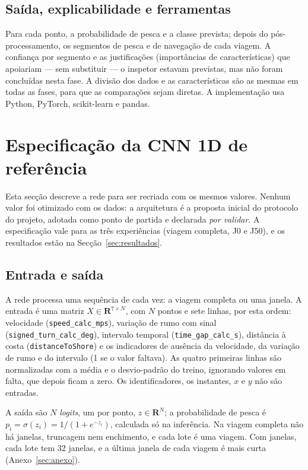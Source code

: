 \documentclass{article}
\newcommand{\revtext}[2]{{\color{#1}#2}}
\begin{document}
\subsection{\texorpdfstring{\revtext{rev023}{Saída, explicabilidade e ferramentas}}{Saída, explicabilidade e ferramentas}}
\label{sec:abordagem-saida}

\revtext{rev062}{Para cada ponto, a probabilidade de pesca e a classe prevista; depois do pós-processamento, os segmentos de pesca e de navegação de cada viagem. A confiança por segmento e as justificações (importâncias de características) que apoiariam --- sem substituir --- o inspetor estavam previstas, mas não foram concluídas nesta fase.} \revtext{rev021}{A divisão dos dados e as características são as mesmas em todas as fases, para que as comparações sejam diretas.} A implementação usa Python, PyTorch, scikit-learn e pandas.

\section{\texorpdfstring{Especificação da CNN 1D de referência}{Especificação da CNN 1D de referência}}
\label{sec:cnn-especificacao}

\revtext{rev052}{Esta secção descreve a rede para ser recriada com os mesmos valores. Nenhum valor foi otimizado com os dados: a arquitetura é a proposta inicial do protocolo do projeto, adotada como ponto de partida e declarada \emph{por validar}. A especificação vale para as três experiências (viagem completa, J0 e J50), e os resultados estão na Secção~\ref{sec:resultados}.}

\subsection{\texorpdfstring{Entrada e saída}{Entrada e saída}}

\revtext{rev052}{A rede processa uma sequência de cada vez: a viagem completa ou uma janela. A entrada é uma matriz $X\in\mathbf{R}^{7\times N}$, com $N$ pontos e sete linhas, por esta ordem: velocidade (\texttt{speed\_calc\_mps}), variação de rumo com sinal (\texttt{signed\_turn\_calc\_deg}), intervalo temporal (\texttt{time\_gap\_calc\_s}), distância à costa (\texttt{distanceToShore}) e os indicadores de ausência da velocidade, da variação de rumo e do intervalo (1 se o valor faltava). As quatro primeiras linhas são normalizadas com a média e o desvio-padrão do treino, ignorando valores em falta, que depois ficam a zero. Os identificadores, os instantes, $x$ e $y$ não são entradas.

A saída são $N$ \emph{logits}, um por ponto, $z\in\mathbf{R}^{N}$; a probabilidade de pesca é $p_i=\sigma(z_i)=1/(1+e^{-z_i})$, calculada só na inferência. Na viagem completa não há janelas, truncagem nem enchimento, e cada lote é uma viagem. Com janelas, cada lote tem 32 janelas, e a última janela de cada viagem é mais curta (Anexo~\ref{sec:anexo}).}
\end{document}
